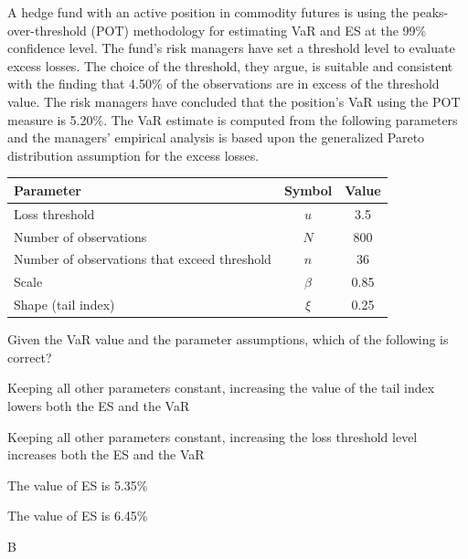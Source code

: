 \documentclass{article}
\newcounter{question} %
\begin{document}
\begin{question}
    A hedge fund with an active position in commodity futures is using the peaks-over-threshold (POT) methodology for estimating VaR and ES at the 99\% confidence level. The fund's risk managers have set a threshold level to evaluate excess losses. The choice of the threshold, they argue, is suitable and consistent with the finding that 4.50\% of the observations are in excess of the threshold value. The risk managers have concluded that the position's VaR using the POT measure is 5.20\%. The VaR estimate is computed from the following parameters and the managers' empirical analysis is based upon the generalized Pareto distribution assumption for the excess losses.
     
    \begin{table}[H]
        \centering
        \begin{tabular}{|l|c|c|}
        \hline
        \textbf{Parameter} & \textbf{Symbol} & \textbf{Value} \\
        \hline
        Loss threshold & $u$ & 3.5 \\
        Number of observations & $N$ & 800 \\
        Number of observations that exceed threshold & $n$ & 36 \\
        Scale & $\beta$ & 0.85 \\
        Shape (tail index) & $\xi$ & 0.25 \\
        \hline
        \end{tabular}
        \end{table}
    
    Given the VaR value and the parameter assumptions, which of the following is correct?
\end{question}

\begin{choices}
    \item Keeping all other parameters constant, increasing the value of the tail index lowers both the ES and the VaR
    \item Keeping all other parameters constant, increasing the loss threshold level increases both the ES and the VaR
    \item The value of ES is 5.35\%
    \item The value of ES is 6.45\%
\end{choices}

\begin{correctanswer}
    B
\end{correctanswer}
\end{document}

